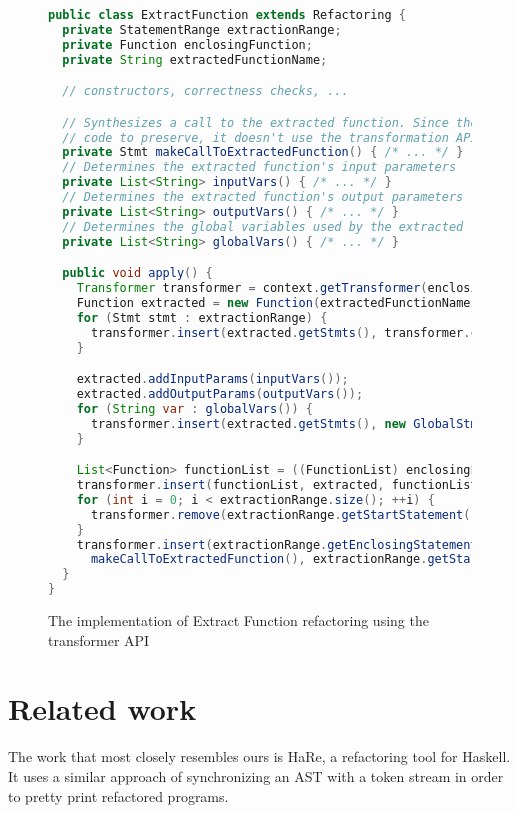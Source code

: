 \begin{figure}
\begin{lstlisting}[numbers=none, language=Java]
public class ExtractFunction extends Refactoring {
  private StatementRange extractionRange;
  private Function enclosingFunction;
  private String extractedFunctionName;

  // constructors, correctness checks, ...

  // Synthesizes a call to the extracted function. Since there is no
  // code to preserve, it doesn't use the transformation API.
  private Stmt makeCallToExtractedFunction() { /* ... */ }
  // Determines the extracted function's input parameters
  private List<String> inputVars() { /* ... */ }
  // Determines the extracted function's output parameters
  private List<String> outputVars() { /* ... */ }
  // Determines the global variables used by the extracted function
  private List<String> globalVars() { /* ... */ }

  public void apply() {
    Transformer transformer = context.getTransformer(enclosingFunction);
    Function extracted = new Function(extractedFunctionName);
    for (Stmt stmt : extractionRange) {
      transformer.insert(extracted.getStmts(), transformer.copy(stmt), extracted.getNumStmt());
    }

    extracted.addInputParams(inputVars());
    extracted.addOutputParams(outputVars());
    for (String var : globalVars()) {
      transformer.insert(extracted.getStmts(), new GlobalStmt(var), 0);
    }

    List<Function> functionList = ((FunctionList) enclosingFunction.getParent()).getFunctions();
    transformer.insert(functionList, extracted, functionList.getIndexOfChild(enclosingFunction) + 1);
    for (int i = 0; i < extractionRange.size(); ++i) {
      transformer.remove(extractionRange.getStartStatement());
    }
    transformer.insert(extractionRange.getEnclosingStatementList(),
      makeCallToExtractedFunction(), extractionRange.getStartIndex());
  }
}
\end{lstlisting}
\caption{The implementation of Extract Function refactoring using the transformer API}
\label{Fig:InlineVariable}
\end{figure}

\section{Related work}

The work that most closely resembles ours is HaRe, a refactoring tool for
Haskell.  It uses a similar approach of synchronizing an AST with a token
stream in order to pretty print refactored programs.

